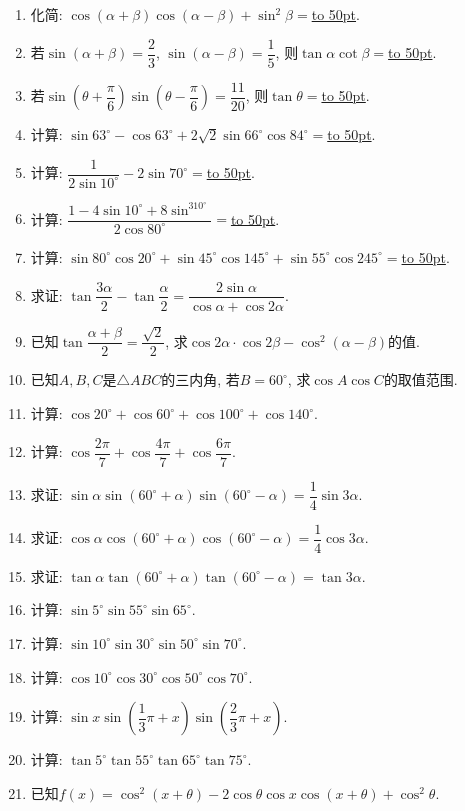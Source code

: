 \documentclass[10pt,a4paper]{article}
\newcommand{\blank}[1]{\underline{\hbox to #1pt{}}}
\begin{document}
\begin{enumerate}[1.]
\item 化简: $\cos (\alpha +\beta)\cos (\alpha -\beta)+\sin ^2\beta =$\blank{50}.
\item 若$\sin (\alpha +\beta)=\dfrac 23$, $\sin (\alpha -\beta)=\dfrac 15$, 则$\tan \alpha \cot \beta =$\blank{50}.
\item 若$\sin (\theta +\dfrac\pi 6)\sin (\theta -\dfrac{\pi}6)=\dfrac {11}{20}$, 则$\tan \theta =$\blank{50}.
\item 计算: $\sin 63^\circ -\cos 63^\circ +2\sqrt 2\sin 66^\circ \cos 84^\circ =$\blank{50}.
\item 计算: $\dfrac 1{2\sin 10^\circ}-2\sin 70^\circ =$\blank{50}.
\item 计算: $\dfrac{1-4\sin 10^\circ +8\sin ^310^\circ}{2\cos 80^\circ}=$\blank{50}.
\item 计算: $\sin 80^\circ \cos 20^\circ +\sin 45^\circ \cos 145^\circ +\sin 55^\circ \cos 245^\circ =$\blank{50}.
\item 求证: $\tan \dfrac{3\alpha} 2-\tan \dfrac{\alpha}2=\dfrac {2\sin \alpha}{\cos \alpha +\cos 2\alpha}$.
\item 已知$\tan \dfrac{\alpha +\beta}2=\dfrac{\sqrt 2}2$, 求$\cos 2\alpha \cdot \cos 2\beta -\cos ^2(\alpha -\beta)$的值.
\item 已知$A,B,C$是$\triangle ABC$的三内角, 若$B=60^\circ$, 求$\cos A\cos C$的取值范围.
\item 计算: $\cos 20^\circ +\cos 60^\circ +\cos 100^\circ +\cos 140^\circ$.
\item 计算: $\cos \dfrac{2\pi}7+\cos \dfrac{4\pi}7+\cos \dfrac{6\pi}7$.
\item 求证: $\sin \alpha \sin (60^{\circ}+\alpha)\sin (60^{\circ}-\alpha)=\dfrac 14\sin 3\alpha$.
\item 求证: $\cos \alpha \cos (60^{\circ}+\alpha)\cos (60^{\circ}-\alpha)=\dfrac 14\cos 3\alpha$.
\item 求证: $\tan \alpha \tan (60^{\circ}+\alpha)\tan (60^{\circ}-\alpha)=\tan 3\alpha$.
\item 计算: $\sin 5^\circ \sin 55^\circ \sin 65^\circ$.
\item 计算: $\sin 10^\circ \sin 30^\circ \sin 50^\circ \sin 70^\circ$.
\item 计算: $\cos 10^\circ \cos 30^\circ \cos 50^\circ \cos 70^\circ$.
\item 计算: $\sin x\sin (\dfrac 13\pi +x)\sin (\dfrac 23\pi +x)$.
\item 计算: $\tan 5^\circ \tan 55^\circ \tan 65^\circ \tan 75^\circ$.
\item 已知$f(x)=\cos ^2(x+\theta)-2\cos \theta \cos x\cos (x+\theta)+\cos ^2\theta$.\\

\end{enumerate}
\end{document}
